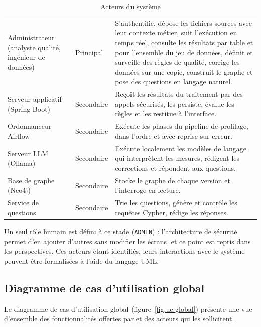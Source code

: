 \begin{table}[H]
\centering
\small
\begin{tabular}{|L{3.4cm}|L{1.9cm}|L{8.7cm}|}
\hline
{} &  &  \\ \hline
Administrateur (analyste qualité, ingénieur de données) & Principal & S'authentifie, dépose les fichiers sources avec leur contexte métier, suit l'exécution en temps réel, consulte les résultats par table et pour l'ensemble du jeu de données, définit et surveille des règles de qualité, corrige les données sur une copie, construit le graphe et pose des questions en langage naturel. \\ \hline
Serveur applicatif (Spring Boot) & Secondaire & Reçoit les résultats du traitement par des appels sécurisés, les persiste, évalue les règles et les restitue à l'interface. \\ \hline
Ordonnanceur Airflow & Secondaire & Exécute les phases du pipeline de profilage, dans l'ordre et avec reprise sur erreur. \\ \hline
Serveur LLM (Ollama) & Secondaire & Exécute localement les modèles de langage qui interprètent les mesures, rédigent les corrections et répondent aux questions. \\ \hline
Base de graphe (Neo4j) & Secondaire & Stocke le graphe de chaque version et l'interroge en lecture. \\ \hline
Service de questions & Secondaire & Trie les questions, génère et contrôle les requêtes Cypher, rédige les réponses. \\ \hline
\end{tabular}
\caption{Acteurs du système \projet}
\label{tab:acteurs}
\end{table}

Un seul rôle humain est défini à ce stade (\texttt{ADMIN}) : l'architecture de sécurité permet d'en ajouter d'autres sans modifier les écrans, et ce point est repris dans les perspectives. Ces acteurs étant identifiés, leurs interactions avec le système peuvent être formalisées à l'aide du langage UML.

\subsection{Diagramme de cas d'utilisation global}

Le diagramme de cas d'utilisation global (figure~\ref{fig:uc-global}) présente une vue d'ensemble des fonctionnalités offertes par \projet{} et des acteurs qui les sollicitent.

